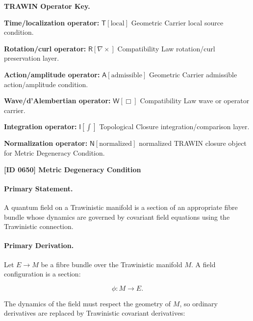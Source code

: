 \par\vspace{0.45\baselineskip}
\noindent\begin{minipage}[t]{\linewidth}
\begingroup
\small
\raggedright
\textbf{TRAWIN Operator Key.}\par
\noindent\textbf{Time/localization operator:} $\mathsf{T}\!\left[\mathrm{local}\right]$ Geometric Carrier local source condition.\par
\noindent\textbf{Rotation/curl operator:} $\mathsf{R}\!\left[\nabla\times\right]$ Compatibility Law rotation/curl preservation layer.\par
\noindent\textbf{Action/amplitude operator:} $\mathsf{A}\!\left[\mathrm{admissible}\right]$ Geometric Carrier admissible action/amplitude condition.\par
\noindent\textbf{Wave/d'Alembertian operator:} $\mathsf{W}\!\left[\Box\right]$ Compatibility Law wave or operator carrier.\par
\noindent\textbf{Integration operator:} $\mathsf{I}\!\left[\int\right]$ Topological Closure integration/comparison layer.\par
\noindent\textbf{Normalization operator:} $\mathsf{N}\!\left[\mathrm{normalized}\right]$ normalized TRAWIN closure object for Metric Degeneracy Condition.\par
\endgroup
\end{minipage}

\clearpage
\noindent\textbf{[ID 0650] Metric Degeneracy Condition}\par
\vspace{0.35em}
\paragraph{Primary Statement.}
A quantum field on a Trawinistic manifold is a section of an appropriate fibre bundle whose dynamics are governed by covariant field equations using the Trawinistic connection.

\paragraph{Primary Derivation.}
Let $E\to M$ be a fibre bundle over the Trawinistic manifold $M$.  
A field configuration is a section:

\begin{equation}
\phi:M\to E .
\end{equation}

The dynamics of the field must respect the geometry of $M$, so ordinary derivatives are replaced by Trawinistic covariant derivatives:

